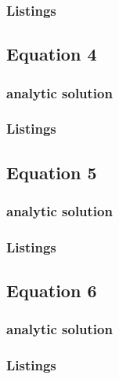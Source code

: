\subsubsection{Listings}



\subsection{Equation 4}
\subsubsection{analytic solution}

\subsubsection{Listings}




\subsection{Equation 5}
\subsubsection{analytic solution}

\subsubsection{Listings}




\subsection{Equation 6}
\subsubsection{analytic solution}

\subsubsection{Listings}

